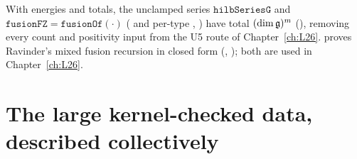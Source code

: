 \begin{remark}
With energies and totals, the unclamped series $\mathtt{hilbSeriesG}$ and $\mathtt{fusionFZ}=\mathtt{fusionOf}(\cdot)$
( and per-type ,
) have total $(\dim\mathfrak g)^m$ (), removing every count and
positivity input from the U5 route of Chapter~\ref{ch:L26}.  proves Ravinder's mixed
fusion recursion in closed form (, ); both are used in
Chapter~\ref{ch:L26}.
\end{remark}

\section{The large kernel-checked data, described collectively}\label{l25:sec:data}

